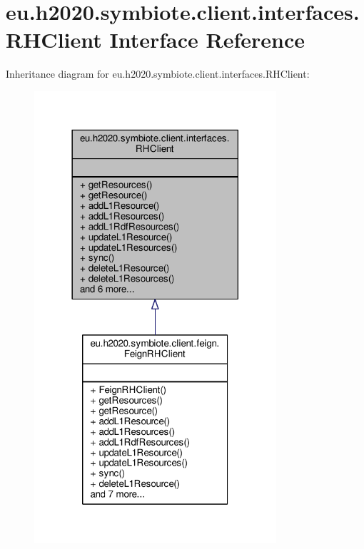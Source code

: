 \hypertarget{interfaceeu_1_1h2020_1_1symbiote_1_1client_1_1interfaces_1_1RHClient}{}\section{eu.\+h2020.\+symbiote.\+client.\+interfaces.\+R\+H\+Client Interface Reference}
\label{interfaceeu_1_1h2020_1_1symbiote_1_1client_1_1interfaces_1_1RHClient}


Inheritance diagram for eu.\+h2020.\+symbiote.\+client.\+interfaces.\+R\+H\+Client\+:\nopagebreak
\begin{figure}[H]
\begin{center}
\leavevmode
\includegraphics[width=254pt]{interfaceeu_1_1h2020_1_1symbiote_1_1client_1_1interfaces_1_1RHClient__inherit__graph}
\end{center}
\end{figure}


